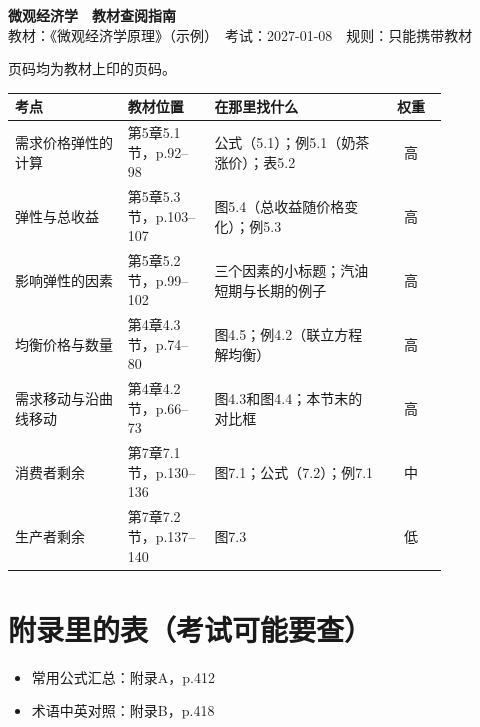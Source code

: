 \documentclass[a4paper,fontset=windows]{ctexart}
\begin{document}
\begin{center}
{\LARGE\bfseries 微观经济学　教材查阅指南}\\[4pt]
{\small 教材：《微观经济学原理》（示例）　考试：2027-01-08　规则：只能携带教材}
\end{center}

页码均为教材上印的页码。

\begin{longtable}{@{}p{0.26\linewidth}p{0.2\linewidth}p{0.4\linewidth}c@{}}
\toprule
考点 & 教材位置 & 在那里找什么 & 权重 \\
\midrule
\endhead
需求价格弹性的计算 & 第5章5.1节，p.92--98 & 公式（5.1）；例5.1（奶茶涨价）；表5.2 & 高 \\
弹性与总收益 & 第5章5.3节，p.103--107 & 图5.4（总收益随价格变化）；例5.3 & 高 \\
影响弹性的因素 & 第5章5.2节，p.99--102 & 三个因素的小标题；汽油短期与长期的例子 & 高 \\
均衡价格与数量 & 第4章4.3节，p.74--80 & 图4.5；例4.2（联立方程解均衡） & 高 \\
需求移动与沿曲线移动 & 第4章4.2节，p.66--73 & 图4.3和图4.4；本节末的对比框 & 高 \\
消费者剩余 & 第7章7.1节，p.130--136 & 图7.1；公式（7.2）；例7.1 & 中 \\
生产者剩余 & 第7章7.2节，p.137--140 & 图7.3 & 低 \\
\bottomrule
\end{longtable}

\section*{附录里的表（考试可能要查）}
\begin{itemize}
\item 常用公式汇总：附录A，p.412
\item 术语中英对照：附录B，p.418
\end{itemize}
\end{document}
